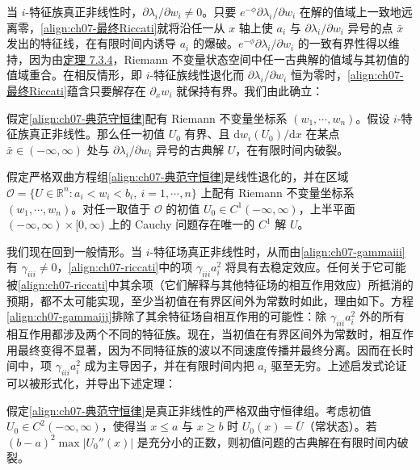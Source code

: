 \documentclass[../../main.tex]{subfiles}
\begin{document}
当 $i$-特征族真正非线性时，$\partial\lambda_i/\partial w_i\neq 0$。只要 $e^{-\phi}\partial\lambda_i/\partial w_i$ 在解的值域上一致地远离零，\eqref{align:ch07-最终Riccati}就将沿任一从 $x$ 轴上使 $a_i$ 与 $\partial\lambda_i/\partial w_i$ 异号的点 $\bar{x}$ 发出的特征线，在有限时间内诱导 $a_i$ 的爆破。$e^{-\phi}\partial\lambda_i/\partial w_i$ 的一致有界性得以维持，因为由\hyperref[theorem:ch07-Riemann不变量沿特征线常值]{定理 7.3.4}，Riemann 不变量状态空间中任一古典解的值域与其初值的值域重合。在相反情形，即 $i$-特征族线性退化而 $\partial\lambda_i/\partial w_i$ 恒为零时，\eqref{align:ch07-最终Riccati}蕴含只要解存在 $\partial_x w_i$ 就保持有界。我们由此确立：

\begin{theorem}\label{theorem:ch07-Riemann系破裂}
假定\eqref{align:ch07-典范守恒律}配有 Riemann 不变量坐标系 $(w_1,\cdots,w_n)$。假设 $i$-特征族真正非线性。那么任一初值 $U_0$ 有界、且 $\mathrm{d}w_i(U_0)/\mathrm{d}x$ 在某点 $\bar{x}\in(-\infty,\infty)$ 处与 $\partial\lambda_i/\partial w_i$ 异号的古典解 $U$，在有限时间内破裂。
\end{theorem}

\begin{theorem}\label{theorem:ch07-线性退化全局存在}
假定严格双曲方程组\eqref{align:ch07-典范守恒律}是线性退化的，并在区域 $\mathscr{O}=\{U\in\mathbb{R}^n:a_i<w_i<b_i,\ i=1,\cdots,n\}$ 上配有 Riemann 不变量坐标系 $(w_1,\cdots,w_n)$。对任一取值于 $\mathscr{O}$ 的初值 $U_0\in C^1(-\infty,\infty)$，上半平面 $(-\infty,\infty)\times[0,\infty)$ 上的 Cauchy 问题存在唯一的 $C^1$ 解 $U$。
\end{theorem}

我们现在回到一般情形。当 $i$-特征场真正非线性时，从而由\eqref{align:ch07-gammaiii}有 $\gamma_{iii}\neq 0$，\eqref{align:ch07-riccati}中的项 $\gamma_{iii}a_i^2$ 将具有去稳定效应。任何关于它可能被\eqref{align:ch07-riccati}中其余项（它们解释与其他特征场的相互作用效应）所抵消的预期，都不太可能实现，至少当初值在有界区间外为常数时如此，理由如下。方程\eqref{align:ch07-gammaijj}排除了其余特征场自相互作用的可能性：除 $\gamma_{iii}a_i^2$ 外的所有相互作用都涉及两个不同的特征族。现在，当初值在有界区间外为常数时，相互作用最终变得不显著，因为不同特征族的波以不同速度传播并最终分离。因而在长时间中，项 $\gamma_{iii}a_i^2$ 成为主导因子，并在有限时间内把 $a_i$ 驱至无穷。上述启发式论证可以被形式化，并导出下述定理：

\begin{theorem}\label{theorem:ch07-小扰动破裂}
假定\eqref{align:ch07-典范守恒律}是真正非线性的严格双曲守恒律组。考虑初值 $U_0\in C^2(-\infty,\infty)$，使得当 $x\leqslant a$ 与 $x\geqslant b$ 时 $U_0(x)=\bar{U}$（常状态）。若 $(b-a)^2\max|U_0''(x)|$ 是充分小的正数，则初值问题的古典解在有限时间内破裂。
\end{theorem}
\end{document}
